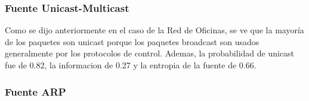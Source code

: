 \subsubsection{Fuente Unicast-Multicast}

\begin{figure}[hp!]
	\begin{minipage}[b]{0.9\linewidth}
	\end{minipage}
\end{figure}

Como se dijo anteriormente en el caso de la Red de Oficinas, se ve que la mayor\'ia
de los paquetes son unicast porque los paquetes broadcast son usados generalmente
por los protocolos de control. Ademas, la probabilidad de unicast fue de 0.82, la
informacion de 0.27 y la entropia de la fuente de 0.66.

\subsubsection{Fuente ARP}


